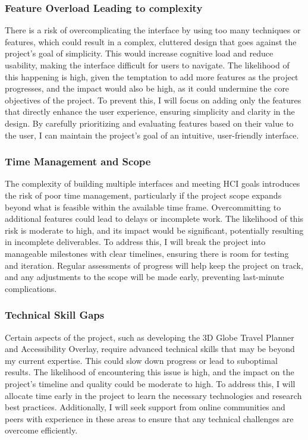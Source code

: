 \documentclass[]{project_plan}
\begin{document}
\subsubsection{Feature Overload Leading to complexity}
There is a risk of overcomplicating the interface by using too many techniques or features, which could result in a complex, cluttered design that goes against the project’s goal of simplicity. This would increase cognitive load and reduce usability, making the interface difficult for users to navigate. The likelihood of this happening is high, given the temptation to add more features as the project progresses, and the impact would also be high, as it could undermine the core objectives of the project. To prevent this, I will focus on adding only the features that directly enhance the user experience, ensuring simplicity and clarity in the design. By carefully prioritizing and evaluating features based on their value to the user, I can maintain the project's goal of an intuitive, user-friendly interface.

\subsubsection{Time Management and Scope}
The complexity of building multiple interfaces and meeting HCI goals introduces the risk of poor time management, particularly if the project scope expands beyond what is feasible within the available time frame. Overcommitting to additional features could lead to delays or incomplete work. The likelihood of this risk is moderate to high, and its impact would be significant, potentially resulting in incomplete deliverables. To address this, I will break the project into manageable milestones with clear timelines, ensuring there is room for testing and iteration. Regular assessments of progress will help keep the project on track, and any adjustments to the scope will be made early, preventing last-minute complications.

\subsubsection{Technical Skill Gaps}
Certain aspects of the project, such as developing the 3D Globe Travel Planner and Accessibility Overlay, require advanced technical skills that may be beyond my current expertise. This could slow down progress or lead to suboptimal results. The likelihood of encountering this issue is high, and the impact on the project’s timeline and quality could be moderate to high. To address this, I will allocate time early in the project to learn the necessary technologies and research best practices. Additionally, I will seek support from online communities and peers with experience in these areas to ensure that any technical challenges are overcome efficiently.
\end{document}
